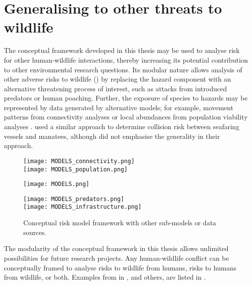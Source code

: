 \section{Generalising to other threats to wildlife}\label{other_threats}

The conceptual framework developed in this thesis may be used to analyse risk for other human-wildlife interactions, thereby increasing its potential contribution to other environmental research questions. Its modular nature allows analysis of other adverse risks to wildlife () by replacing the hazard component with an alternative threatening process of interest, such as attacks from introduced predators or human poaching. Further, the exposure of species to hazards may be represented by data generated by alternative models; for example, movement patterns from connectivity analyses \citep[e.g.][]{mcra08} or local abundances from population viability analyses \citep[e.g.][]{beis02}. \cite{baud13} used a similar approach to determine collision risk between seafaring vessels and manatees, although did not emphasise the generality in their approach.

\begin{figure*}[!h]
  \centering
  	\begin{minipage}[t][][b]{.13\textwidth}
    	\centering
    	\texttt{[image: MODELS\_connectivity.png]}\\
    	\texttt{[image: MODELS\_population.png]}   	
    \end{minipage}
    \hspace{.05\textwidth}
  	\begin{minipage}{.38\textwidth}
    	\centering
    	\texttt{[image: MODELS.png]}
    \end{minipage}
    \hspace{.05\textwidth}
  	\begin{minipage}[t][][b]{.13\textwidth}
    	\centering
    	\texttt{[image: MODELS\_predators.png]}\\
    	\texttt{[image: MODELS\_infrastructure.png]}
    \end{minipage}    	   	   
  \caption[Conceptual risk model framework for other threats]{Conceptual risk model framework with other sub-models or data sources.}
  \label{gen_framework}
\end{figure*}

The modularity of the conceptual framework in this thesis allows unlimited possibilities for future research projects. Any human-wildlife conflict can be conceptually framed to analyse risks to wildlife from humans, risks to humans from wildlife, or both. Examples from  in , and others, are listed in .

